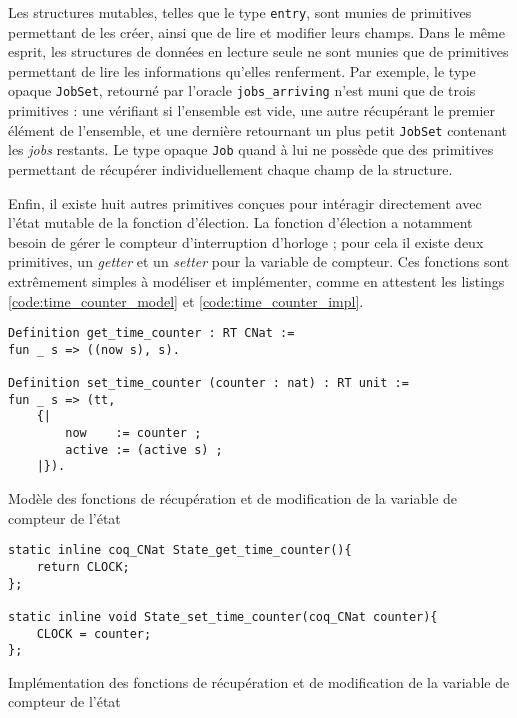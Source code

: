 	Les structures mutables, telles que le type \texttt{entry}, sont munies de primitives permettant de les créer, ainsi que de lire et modifier leurs champs. Dans le même esprit, les structures de données en lecture seule ne sont munies que de primitives permettant de lire les informations qu'elles renferment. Par exemple, le type opaque \texttt{JobSet}, retourné par l'oracle \texttt{jobs\_arriving} n'est muni que de trois primitives : une vérifiant si l'ensemble est vide, une autre récupérant le premier élément de l'ensemble, et une dernière retournant un plus petit \texttt{JobSet} contenant les \emph{jobs} restants. Le type opaque \texttt{Job} quand à lui ne possède que des primitives permettant de récupérer individuellement chaque champ de la structure.
	
	Enfin, il existe huit autres primitives conçues pour intéragir directement avec l'état mutable de la fonction d'élection. La fonction d'élection a notamment besoin de gérer le compteur d'interruption d'horloge ; pour cela il existe deux primitives, un \emph{getter} et un \emph{setter} pour la variable de compteur.
	Ces fonctions sont extrêmement simples à modéliser et implémenter, comme en attestent les listings \ref{code:time_counter_model} et \ref{code:time_counter_impl}.

	\begin{listing}[!ht]
	\begin{verbatim}
Definition get_time_counter : RT CNat :=
fun _ s => ((now s), s).

Definition set_time_counter (counter : nat) : RT unit :=
fun _ s => (tt,
    {|
        now    := counter ;
        active := (active s) ;
    |}).
	\end{verbatim}
	\caption{Modèle des fonctions de récupération et de modification de la variable de compteur de l'état}
	\label{code:time_counter_model}
	\end{listing}

	\begin{listing}[!ht]
	\begin{verbatim}
static inline coq_CNat State_get_time_counter(){
    return CLOCK;
};

static inline void State_set_time_counter(coq_CNat counter){
    CLOCK = counter;
};
	\end{verbatim}
	\caption{Implémentation des fonctions de récupération et de modification de la variable de compteur de l'état}
	\label{code:time_counter_impl}
	\end{listing}

